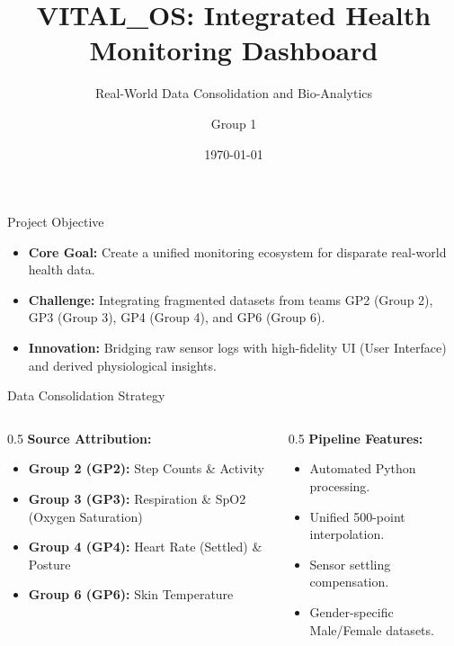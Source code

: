 \documentclass[aspectratio=169]{beamer}
\title[VITAL\_OS Dashboard]{VITAL\_OS: Integrated Health Monitoring Dashboard}
\subtitle{Real-World Data Consolidation and Bio-Analytics}
\author{Group 1}
\institute{Medical Device Manufacturing}
\date{\today}
\begin{document}
\begin{frame}
    \titlepage
\end{frame}

\begin{frame}{Project Objective}
    \begin{itemize}
        \item \textbf{Core Goal:} Create a unified monitoring ecosystem for disparate real-world health data.
        \item \textbf{Challenge:} Integrating fragmented datasets from teams GP2 (Group 2), GP3 (Group 3), GP4 (Group 4), and GP6 (Group 6).
        \item \textbf{Innovation:} Bridging raw sensor logs with high-fidelity UI (User Interface) and derived physiological insights.
    \end{itemize}
\end{frame}

\begin{frame}{Data Consolidation Strategy}
    \begin{columns}
        \begin{column}{0.5\textwidth}
            \textbf{Source Attribution:}
            \begin{itemize}
                \item \textbf{Group 2 (GP2):} Step Counts \& Activity
                \item \textbf{Group 3 (GP3):} Respiration \& SpO2 (Oxygen Saturation)
                \item \textbf{Group 4 (GP4):} Heart Rate (Settled) \& Posture
                \item \textbf{Group 6 (GP6):} Skin Temperature
            \end{itemize}
        \end{column}
        \begin{column}{0.5\textwidth}
            \textbf{Pipeline Features:}
            \begin{itemize}
                \item Automated Python processing.
                \item Unified 500-point interpolation.
                \item Sensor settling compensation.
                \item Gender-specific Male/Female datasets.
            \end{itemize}
        \end{column}
    \end{columns}
\end{frame}
\end{document}
